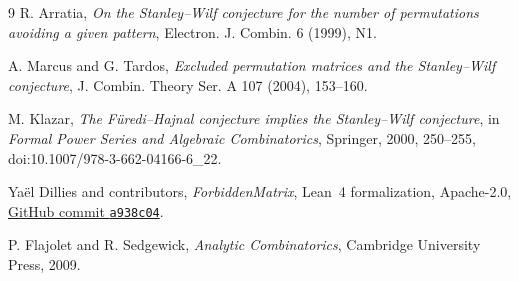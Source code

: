 \documentclass[10pt]{article}
\begin{document}
\begin{thebibliography}{9}
R. Arratia,
\emph{On the Stanley--Wilf conjecture for the number of permutations avoiding
a given pattern}, Electron. J. Combin. 6 (1999), N1.

A. Marcus and G. Tardos,
\emph{Excluded permutation matrices and the Stanley--Wilf conjecture},
J. Combin. Theory Ser. A 107 (2004), 153--160.

M. Klazar,
\emph{The F\"uredi--Hajnal conjecture implies the Stanley--Wilf conjecture},
in \emph{Formal Power Series and Algebraic Combinatorics}, Springer, 2000,
250--255, doi:10.1007/978-3-662-04166-6\_22.

Ya\"el Dillies and contributors,
\emph{ForbiddenMatrix}, Lean~4 formalization, Apache-2.0,
\href{https://github.com/YaelDillies/ForbiddenMatrix/tree/a938c04974d145131c446e8d488b834797ab6ed0}
{GitHub commit \texttt{a938c04}}.

P. Flajolet and R. Sedgewick,
\emph{Analytic Combinatorics}, Cambridge University Press, 2009.
\end{thebibliography}
\end{document}
